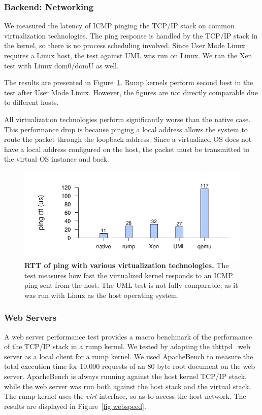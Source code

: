 \subsubsection{Backend: Networking}

We measured the latency of ICMP pinging the TCP/IP stack on common virtualization
technologies.  The ping response is handled by the TCP/IP stack in the kernel, so there is no
process scheduling involved.  Since User Mode Linux requires a
Linux host, the test against UML was run on Linux.  We ran the Xen
test with Linux dom0/domU as well.

The results are presented in Figure~\ref{fig:ping}.  Rump kernels
perform second best in the test after User Mode Linux.  However,
the figures are not directly comparable due to different hosts.

All virtualization technologies perform significantly worse than
the native case.  This performance drop is because pinging a local address
allows the system to route the packet through the loopback address.
Since a virtualized OS does not have a local address configured on the
host, the packet must be transmitted to the virtual OS instance and back.

\begin{figure}
\includegraphics{ping.pdf}
\caption[RTT of ping with various virtualization technologies]{
\textbf{RTT of ping with various virtualization technologies.}
The test measures how fast the virtualized kernel responds to an ICMP
ping sent from the host.  The UML test is not fully comparable, as it
was run with Linux as the host operating system.
}
\label{fig:ping}
\end{figure}

\subsubsection{Web Servers}
\label{chap:webserv}

A web server performance test provides a macro benchmark of the
performance of the TCP/IP stack in a rump kernel.  We tested by
adapting the thttpd~\cite{thttpd} web server as a local client for
a rump kernel.  We used ApacheBench to measure the total execution time for
10,000 requests of an 80 byte root document on the web server.
ApacheBench is always running against the host kernel TCP/IP stack,
while the web server was run both against the host stack and the
virtual stack.  The rump kernel uses the \textit{virt} interface,
so as to access the host network.  The results are displayed in
Figure~\ref{fig:webspeed}.

